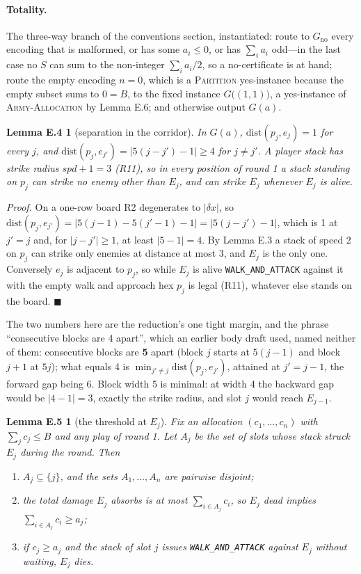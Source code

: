 \documentclass[11pt,a4paper]{article}
\theoremstyle{plain}
\newtheorem*{lemEsepone}{Lemma E.4}
\newtheorem*{lemEkillone}{Lemma E.5}
\theoremstyle{definition}
\theoremstyle{plain}
\theoremstyle{definition}
\theoremstyle{remark}
\newcommand{\ALLOC}{\textsc{Army-Allocation}}
\newcommand{\PARTITION}{\textsc{Partition}}
\newcommand{\qedbox}{\hfill$\blacksquare$}
\begin{document}
\paragraph{Totality.} The three-way branch of the conventions section, instantiated:
route to $G_{\mathrm{no}}$ every encoding that is malformed, or has some $a_i\le 0$, or has
$\sum_i a_i$ odd---in the last case no $S$ can sum to the non-integer $\sum_i a_i/2$, so a
no-certificate is at hand; route the empty encoding $n=0$, which is a \PARTITION{}
yes-instance because the empty subset sums to $0=B$, to the fixed instance
$G\bigl((1,1)\bigr)$, a yes-instance of \ALLOC{} by Lemma E.6; and otherwise output $G(a)$.

\begin{lemEsepone}[separation in the corridor]
In $G(a)$, $\mathrm{dist}(p_j,e_j)=1$ for every $j$, and
$\mathrm{dist}(p_j,e_{j'})=|5(j-j')-1|\ge 4$ for $j\ne j'$. A player stack has strike radius
$\mathit{spd}+1=3$ (R11), so in \emph{every} position of round 1 a stack standing on $p_j$
can strike no enemy other than $E_j$, and can strike $E_j$ whenever $E_j$ is alive.
\end{lemEsepone}

\noindent\emph{Proof.} On a one-row board R2 degenerates to $|\delta x|$, so
$\mathrm{dist}(p_j,e_{j'})=|5(j-1)-5(j'-1)-1|=|5(j-j')-1|$, which is 1 at $j'=j$ and, for
$|j-j'|\ge 1$, at least $|5-1|=4$. By Lemma E.3 a stack of speed 2 on $p_j$ can strike only
enemies at distance at most 3, and $E_j$ is the only one. Conversely $e_j$ is adjacent to
$p_j$, so while $E_j$ is alive \texttt{WALK\_AND\_ATTACK} against it with the empty walk and
approach hex $p_j$ is legal (R11), whatever else stands on the board. \qedbox

\smallskip
The two numbers here are the reduction's one tight margin, and the phrase ``consecutive
blocks are 4 apart'', which an earlier body draft used, named neither of them: consecutive blocks are \textbf{5}
apart (block $j$ starts at $5(j-1)$ and block $j+1$ at $5j$); what equals 4 is
$\min_{j'\ne j}\mathrm{dist}(p_j,e_{j'})$, attained at $j'=j-1$, the forward gap being 6.
Block width 5 is minimal: at width 4 the backward gap would be $|4-1|=3$, exactly the strike
radius, and slot $j$ would reach $E_{j-1}$.

\begin{lemEkillone}[the threshold at $E_j$]
Fix an allocation $(c_1,\dots,c_n)$ with $\sum_j c_j\le B$ and any play of round 1.
Let $A_j$ be the set of slots whose stack struck $E_j$ during the round. Then
\begin{enumerate}
\item $A_j\subseteq\{j\}$, and the sets $A_1,\dots,A_n$ are pairwise disjoint;
\item the total damage $E_j$ absorbs is at most $\sum_{i\in A_j}c_i$, so $E_j$ dead implies
  $\sum_{i\in A_j}c_i\ge a_j$;
\item if $c_j\ge a_j$ and the stack of slot $j$ issues \texttt{WALK\_AND\_ATTACK} against
  $E_j$ without waiting, $E_j$ dies.
\end{enumerate}
\end{lemEkillone}
\end{document}
